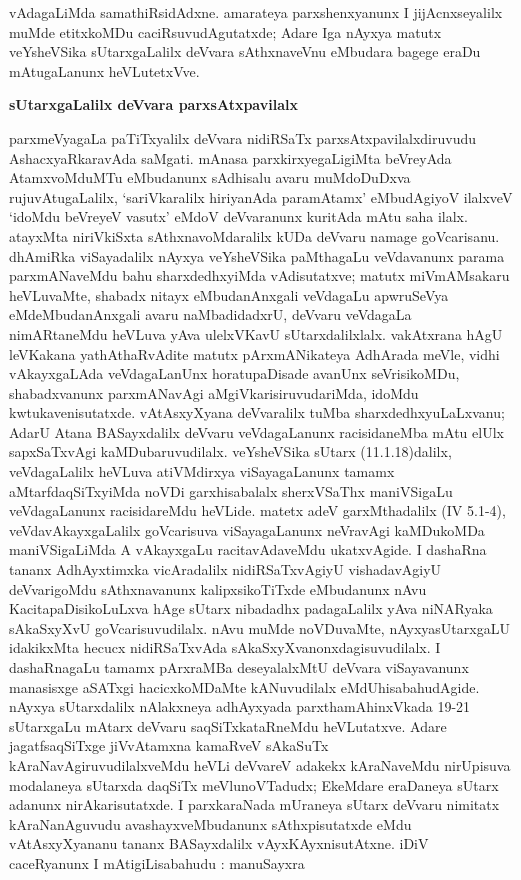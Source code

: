 vAdagaLiMda samathiRsidAdxne. amarateya parxshenxyanunx I jijAcnxseyalilx muMde etitxkoMDu caciRsuvudAgutatxde; Adare Iga nAyxya matutx veYsheVSika sUtarxgaLalilx deVvara sAthxnaveVnu eMbudara bagege eraDu mAtugaLanunx heVLutetxVve.

\smallskip
\begin{center}
{\Large\bf sUtarxgaLalilx deVvara parxsAtxpavilalx}
\end{center}

parxmeVyagaLa paTiTxyalilx deVvara nidiRSaTx parxsAtxpavilalxdiruvudu AshacxyaRkaravAda saMgati. mAnasa parxkirxyegaLigiMta beVreyAda AtamxvoMduMTu eMbudanunx sAdhisalu avaru muMdoDuDxva rujuvAtugaLalilx, `sariVkaralilx hiriyanAda paramAtamx' eMbudAgiyoV ilalxveV `idoMdu beVreyeV vasutx' eMdoV deVvaranunx kuritAda mAtu saha ilalx. atayxMta niriVkiSxta sAthxnavoMdaralilx kUDa deVvaru namage goVcarisanu. dhAmiRka viSayadalilx nAyxya veYsheVSika paMthagaLu veVdavanunx parama parxmANaveMdu bahu sharxdedhxyiMda vAdisutatxve; matutx miVmAMsakaru heVLuvaMte, shabadx nitayx eMbudanAnxgali veVdagaLu apwruSeVya eMdeMbudanAnxgali avaru naMbadidadxrU, deVvaru veVdagaLa nimARtaneMdu heVLuva yAva ulelxVKavU sUtarxdalilxlalx. vakAtxrana hAgU leVKakana yathAthaRvAdite matutx pArxmANikateya AdhArada meVle, vidhi vAkayxgaLAda veVdagaLanUnx horatupaDisade avanUnx seVrisikoMDu, shabadxvanunx parxmANavAgi aMgiVkarisiruvudariMda, idoMdu kwtukavenisutatxde. vAtAsxyXyana deVvaralilx tuMba sharxdedhxyuLaLxvanu; AdarU Atana BASayxdalilx deVvaru veVdagaLanunx racisidaneMba mAtu elUlx sapxSaTxvAgi kaMDubaruvudilalx. veYsheVSika sUtarx {\rm(11.1.18)}dalilx, veVdagaLalilx heVLuva atiVMdirxya viSayagaLanunx tamamx aMtarfdaqSiTxyiMda noVDi garxhisabalalx sherxVSaThx maniVSigaLu veVdagaLanunx racisidareMdu heVLide. matetx adeV garxMthadalilx {\rm(IV 5.1-4)}, veVdavAkayxgaLalilx goVcarisuva viSayagaLanunx neVravAgi kaMDukoMDa maniVSigaLiMda A vAkayxgaLu racitavAdaveMdu ukatxvAgide. I dashaRna tananx AdhAyxtimxka vicAradalilx nidiRSaTxvAgiyU vishadavAgiyU deVvarigoMdu sAthxnavanunx kalipxsikoTiTxde eMbudanunx nAvu KacitapaDisikoLuLxva hAge sUtarx nibadadhx padagaLalilx yAva niNARyaka sAkaSxyXvU goVcarisuvudilalx. nAvu muMde noVDuvaMte, nAyxyasUtarxgaLU idakikxMta hecucx nidiRSaTxvAda sAkaSxyXvanonxdagisuvudilalx. I dashaRnagaLu tamamx pArxraMBa deseyalalxMtU deVvara viSayavanunx manasisxge aSATxgi hacicxkoMDaMte kANuvudilalx eMdUhisabahudAgide. nAyxya sUtarxdalilx nAlakxneya adhAyxyada parxthamAhinxVkada {\rm 19-21} sUtarxgaLu mAtarx deVvaru saqSiTxkataRneMdu heVLutatxve. Adare jagatfsaqSiTxge jiVvAtamxna kamaRveV sAkaSuTx kAraNavAgiruvudilalxveMdu heVLi deVvareV adakekx kAraNaveMdu nirUpisuva modalaneya sUtarxda daqSiTx meVlunoVTadudx; EkeMdare eraDaneya sUtarx adanunx nirAkarisutatxde. I parxkaraNada mUraneya sUtarx deVvaru nimitatx kAraNanAguvudu avashayxveMbudanunx sAthxpisutatxde eMdu vAtAsxyXyananu tananx BASayxdalilx vAyxKAyxnisutAtxne. iDiV caceRyanunx I mAtigiLisabahudu : manuSayxra 